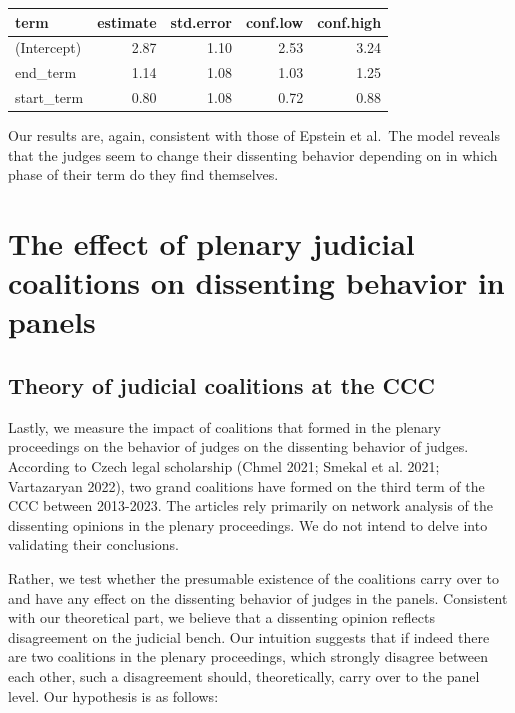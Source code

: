 \documentclass[
  11pt,
]{article}
\begin{document}
\begin{longtable}[]{@{}lrrrr@{}}
\toprule\noalign{}
term & estimate & std.error & conf.low & conf.high \\
\midrule\noalign{}
\endhead
\bottomrule\noalign{}
\endlastfoot
(Intercept) & 2.87 & 1.10 & 2.53 & 3.24 \\
end\_term & 1.14 & 1.08 & 1.03 & 1.25 \\
start\_term & 0.80 & 1.08 & 0.72 & 0.88 \\
\end{longtable}

Our results are, again, consistent with those of Epstein et al.~The
model reveals that the judges seem to change their dissenting behavior
depending on in which phase of their term do they find themselves.

\hypertarget{the-effect-of-plenary-judicial-coalitions-on-dissenting-behavior-in-panels}{%
\section{The effect of plenary judicial coalitions on dissenting
behavior in
panels}\label{the-effect-of-plenary-judicial-coalitions-on-dissenting-behavior-in-panels}}

\hypertarget{theory-of-judicial-coalitions-at-the-ccc}{%
\subsection{Theory of judicial coalitions at the
CCC}\label{theory-of-judicial-coalitions-at-the-ccc}}

Lastly, we measure the impact of coalitions that formed in the plenary
proceedings on the behavior of judges on the dissenting behavior of
judges. According to Czech legal scholarship (Chmel 2021; Smekal et al.
2021; Vartazaryan 2022), two grand coalitions have formed on the third
term of the CCC between 2013-2023. The articles rely primarily on
network analysis of the dissenting opinions in the plenary proceedings.
We do not intend to delve into validating their conclusions.

Rather, we test whether the presumable existence of the coalitions carry
over to and have any effect on the dissenting behavior of judges in the
panels. Consistent with our theoretical part, we believe that a
dissenting opinion reflects disagreement on the judicial bench. Our
intuition suggests that if indeed there are two coalitions in the
plenary proceedings, which strongly disagree between each other, such a
disagreement should, theoretically, carry over to the panel level. Our
hypothesis is as follows:
\end{document}
